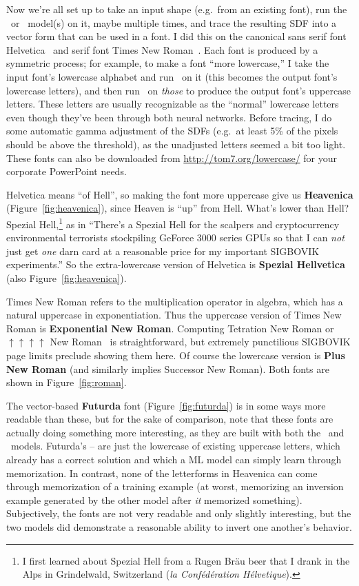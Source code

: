 \documentclass[twocolumn]{article}
\begin{document}
\medskip
Now we're all set up to take an input shape (e.g.~from an existing
font), run the \makeuppercase\ or \makelowercase\ model(s) on it,
maybe multiple times, and trace the resulting SDF into a vector form
that can be used in a font. I did this on the canonical sans serif
font Helvetica~\cite{helvetica} and serif font Times New
Roman~\cite{timesnewroman}. Each font is produced by a symmetric
process; for example, to make a font ``more lowercase,'' I take the
input font's lowercase alphabet and run \makelowercase\ on it (this
becomes the output font's lowercase letters), and then run
\makeuppercase\ on {\em those} to produce the output font's uppercase
letters. These letters are usually recognizable as the ``normal''
lowercase letters even though they've been through both neural
networks. Before tracing, I do some automatic gamma adjustment of the
SDFs (e.g.~at least 5\% of the pixels should be above the threshold),
as the unadjusted letters seemed a bit too light. These fonts can
also be downloaded from \url{http://tom7.org/lowercase/} for your
corporate PowerPoint needs.

Helvetica means ``of Hell'', so making the font more uppercase give us
{\bf Heavenica} (Figure~\ref{fig:heavenica}), since Heaven is ``up''
from Hell. What's lower than Hell? Spezial Hell,\footnote{
  I first learned about Spezial Hell from a Rugen Br\"au beer that I
  drank in the Alps in Grindelwald, Switzerland ({\it la
    Conf\'ed\'eration H\'elvetique}).
}
%
as in ``There's a Spezial Hell for the scalpers and cryptocurrency
environmental terrorists stockpiling GeForce 3000 series GPUs so that
I can {\em not} just get {\em one} darn card at a reasonable price for
my important SIGBOVIK experiments.'' So the extra-lowercase version of
Helvetica is {\bf Spezial Hellvetica} (also Figure~\ref{fig:heavenica}).

Times New Roman refers to the multiplication operator in algebra,
which has a natural uppercase in exponentiation. Thus the uppercase
version of Times New Roman is {\bf Exponential New Roman}. Computing
Tetration New Roman or $\uparrow\uparrow\uparrow\uparrow$ New
Roman~\cite{knuth1976coping} is straightforward, but extremely
punctilious SIGBOVIK page limits preclude showing them here. Of course
the lowercase version is {\bf Plus New Roman} (and similarly implies
Successor New Roman). Both fonts are shown in Figure~\ref{fig:roman}.

The vector-based {\bf Futurda} font (Figure~\ref{fig:futurda}) is in
some ways more readable than these, but for the sake of comparison,
note that these fonts are actually doing something more interesting,
as they are built with both the \makeuppercase\ and
\makelowercase\ models. Futurda's -- are
just the lowercase of existing uppercase letters, which already has a
correct solution and which a ML model can simply learn through
memorization. In contrast, none of the letterforms in Heavenica can
come through memorization of a training example (at worst, memorizing
an inversion example generated by the other model after {\em it}
memorized something). Subjectively, the fonts are not very readable
and only slightly interesting, but the two models did demonstrate a
reasonable ability to invert one another's behavior.
\end{document}
